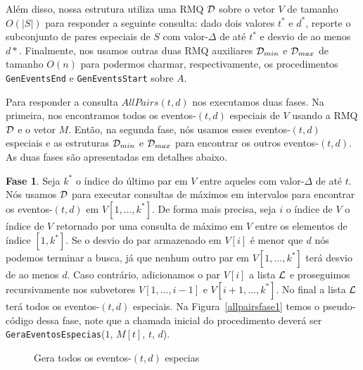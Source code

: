 \documentclass[12pt]{article}
\begin{document}
Além disso, nossa estrutura utiliza uma RMQ ${\cal D}$ sobre o vetor $V$ de tamanho $O(|S|)$ para responder a seguinte consulta:
 dado dois valores $t^*$ e $d^*$, reporte o subconjunto de pares especiais de $S$ com valor-$\Delta$ de até $t^*$ e 
desvio de ao menos $d*$. Finalmente, nos usamos outras duas RMQ auxiliares ${\cal D}_{min}$ e 
${\cal D}_{max}$ de tamanho $O(n)$ para podermos charmar, respectivamente, os procedimentos {\tt GenEventsEnd}
e {\tt GenEventsStart} sobre $A$. 

Para responder a consulta $AllPairs(t, d)$ nos executamos duas fases. Na primeira, 
nos encontramos todos os eventos-$(t,d)$ especiais de $V$ usando a RMQ ${\cal D}$ e o vetor $M$.
Então, na segunda fase, nós usamos esses eventos-$(t,d)$ especiais e as estruturas 
${\cal D}_{min}$ e ${\cal D}_{max}$ para encontrar os outros eventos-$(t,d)$. As duas fases
são apresentadas em detalhes abaixo.

\textbf{Fase 1}. Seja $k^*$ o índice do último par em $V$ entre aqueles com valor-$\Delta$
de até $t$. Nós usamos ${\cal D}$ para executar consultas de máximos em intervalos para
encontrar os eventos-$(t,d)$ em $V[1, \ldots, k^*]$. De forma mais precisa, seja $i$ o índice
de $V$ o índice de $V$ retornado por uma consulta de máximo em $V$ entre os elementos de
índice $[1, k^*]$. Se o desvio do par armazenado em $V[i]$ é menor que $d$ nós podemos
terminar a busca, já que nenhum outro par em $V[1, \ldots, k^*]$ terá desvio de ao menos $d$.
Caso contrário, adicionamos o par $V[i]$ a lista ${\cal L}$ e proseguimos recursivamente 
nos subvetores $V[1, \ldots, i - 1]$ e $V[i + 1, \ldots, k^*]$. No final a lista ${\cal L}$ terá
todos os eventos-$(t,d)$ especiais. Na Figura~\ref{allpairsfase1} temos o pseudo-código dessa fase,
note que a chamada inicial do procedimento deverá ser {\tt GeraEventosEspecias}($1$, $M[t]$, $t$, $d$).

\begin{figure}

\caption{Gera todos os eventos-$(t,d)$ especias}
\label{prelista}
\end{figure}
\end{document}
